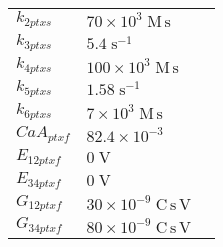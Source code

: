 \documentclass[a4paper,10.0pt]{article}
\begin{document}
{\begin{longtabu}{| l l l |}
  $k_{2 ptxs}$\hspace{0.5cm} & $70\!\times\!10 ^{3}\;\mathrm{M}\,\mathrm{s}$\hspace{0.5cm} & \hspace{0.5cm}\\
  $k_{3 ptxs}$\hspace{0.5cm} & $5.4\;\mathrm{s}^{-1}$\hspace{0.5cm} & \hspace{0.5cm}\\
  $k_{4 ptxs}$\hspace{0.5cm} & $100\!\times\!10 ^{3}\;\mathrm{M}\,\mathrm{s}$\hspace{0.5cm} & \hspace{0.5cm}\\
  $k_{5 ptxs}$\hspace{0.5cm} & $1.58\;\mathrm{s}^{-1}$\hspace{0.5cm} & \hspace{0.5cm}\\
  $k_{6 ptxs}$\hspace{0.5cm} & $7\!\times\!10 ^{3}\;\mathrm{M}\,\mathrm{s}$\hspace{0.5cm} & \hspace{0.5cm}\\
  $CaA_{ptxf}$\hspace{0.5cm} & $82.4\!\times\!10 ^{-3}$\hspace{0.5cm} & \hspace{0.5cm}\\
  $E_{12 ptxf}$\hspace{0.5cm} & $0\;\mathrm{V}$\hspace{0.5cm} & \hspace{0.5cm}\\
  $E_{34 ptxf}$\hspace{0.5cm} & $0\;\mathrm{V}$\hspace{0.5cm} & \hspace{0.5cm}\\
  $G_{12 ptxf}$\hspace{0.5cm} & $30\!\times\!10 ^{-9}\;\mathrm{C}\,\mathrm{s}\,\mathrm{V}$\hspace{0.5cm} & \hspace{0.5cm}\\
  $G_{34 ptxf}$\hspace{0.5cm} & $80\!\times\!10 ^{-9}\;\mathrm{C}\,\mathrm{s}\,\mathrm{V}$\hspace{0.5cm} & \hspace{0.5cm}\\

\end{longtabu}}
\end{document}
